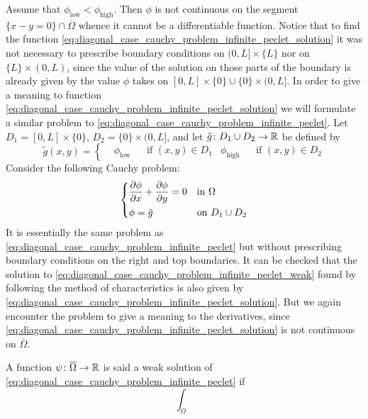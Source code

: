Assume that $\phi_\text{low} < \phi_\text{high}$. Then $\phi$ is not continuous on the segment $\{ x - y = 0 \} \cap \overline{\Omega}$ whence it cannot be a differentiable function. Notice that to find the function \eqref{eq:diagonal_case_cauchy_problem_infinite_peclet_solution} it was not necessary to prescribe boundary conditions on $(0, L] \times \{ L \}$ nor on $\{ L \} \times (0, L)$, since the value of the solution on those parts of the boundary is already given by the value $\phi$ takes on $[0, L] \times \{ 0 \} \cup \{ 0 \} \times (0, L]$. In order to give a meaning to function \eqref{eq:diagonal_case_cauchy_problem_infinite_peclet_solution} we will formulate a similar problem to \eqref{eq:diagonal_case_cauchy_problem_infinite_peclet}. Let $D_1 = [0, L] \times \{ 0 \}$, $D_2 = \{ 0 \} \times (0, L]$, and let $\tilde{g} \colon D_1 \cup D_2 \rightarrow \mathbb{R}$ be defined by
\begin{equation}
	\tilde{g}(x,y) = 
	\left\{
	\begin{aligned}
		&\phi_\text{low}	& &\text{if } (x,y) \in D_1 
		&\phi_\text{high} 	& &\text{if } (x,y) \in D_2
	\end{aligned}
	\right.
\end{equation}
Consider the following Cauchy problem:
\begin{equation} \label{eq:diagonal_case_cauchy_problem_infinite_peclet_weak}
	\left\{
	\begin{aligned}
		&\pdv{\phi}{x} + \pdv{\phi}{y} = 0 &
		&\text{in } \Omega \\
		&\phi = \tilde{g} &
		&\text{on } D_1 \cup D_2
	\end{aligned}
	\right.
\end{equation}
It is essentially the same problem as \eqref{eq:diagonal_case_cauchy_problem_infinite_peclet} but without prescribing boundary conditions on the right and top boundaries. It can be checked that the solution to \eqref{eq:diagonal_case_cauchy_problem_infinite_peclet_weak} found by following the method of characteristics is also given by \eqref{eq:diagonal_case_cauchy_problem_infinite_peclet_solution}. But we again encounter the problem to give a meaning to the derivatives, since \eqref{eq:diagonal_case_cauchy_problem_infinite_peclet_solution} is not continuous on $\overline{\Omega}$. 

\begin{definition}
	A function $\psi \colon \overline{\Omega} \rightarrow \mathbb{R}$ is said a weak solution of \eqref{eq:diagonal_case_cauchy_problem_infinite_peclet} if 
	\[
		\int_\Omega 
	\]
\end{definition}

